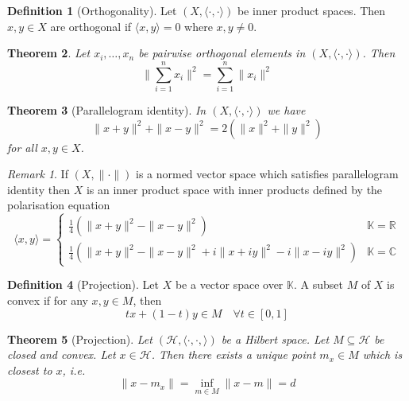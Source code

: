 \documentclass[10pt, oneside, reqno]{amsart}
\theoremstyle{plain}%
\newtheorem{thm}{Theorem}[section]
\theoremstyle{definition}
\newtheorem{defn}[thm]{Definition}
\theoremstyle{remark}
\newtheorem*{rem}{Remark}
\newcommand{\R}{\mathbb{R}}
\newcommand{\K}{\mathbb{K}}
\newcommand{\Hil}{\mathcal{H}}
\newcommand{\Com}{\mathbb{C}}
\begin{document}
\begin{defn}[Orthogonality]
    Let $(X, \langle \cdot , \cdot \rangle )$ be inner product spaces.  Then $x, y \in X $ are orthogonal if $\langle x, y \rangle = 0$ where $x, y \neq 0$.  
\end{defn}

\begin{thm}
    Let $x_i, \dots, x_n$ be pairwise orthogonal elements in $(X, \langle \cdot , \cdot \rangle)$.  Then \[
        \| \sum_{i=1}^n x_i \|^2 = \sum_{i=1}^n \|x_i\|^2
    \]
\end{thm}

\begin{thm}[Parallelogram identity]
    In $(X, \langle \cdot, \cdot \rangle)$ we have \[
         \| x+ y \|^2 + \| x-y \|^2 = 2( \| x \|^2 + \|y \|^2) \tag{$\star$}
    \] for all $x, y \in X$.
\end{thm}

\begin{rem}
    If $(X, \| \cdot \|)$ is a normed vector space which satisfies parallelogram identity then $X$ is an inner product space with inner products defined by the polarisation equation \[
    \langle x, y \rangle =  \begin{cases} 
            \frac{1}{4} \left( \| x + y \|^2 - \| x - y \|^2 \right)    & \K = \R \\
            \frac{1}{4}\left( \| x + y\|^2 - \| x - y \|^2 + i\| x + iy \|^2 - i\|x - iy\|^2 \right)                                                & \K = \Com
        \end{cases}
    \]
\end{rem}

\begin{defn}[Projection]
    Let $X$ be a vector space over $\K$.  A subset $M$ of $X$ is convex if for any $x, y \in M$, then \[
        tx + (1-t) y \in M \quad \forall t \in [0,1]
    \]
\end{defn}

\begin{thm}[Projection]
    Let $(\Hil, \langle \cdot, \cdot, \rangle )$ be a Hilbert space.  Let $M \subseteq \Hil$ be closed and convex.  Let $x \in \Hil$.  Then there exists a unique point $m_x \in M$ which is closest to $x$, i.e. \[
        \| x - m_x \| = \inf_{m \in M} \| x - m \| = d
    \]  
\end{thm}
\end{document}
